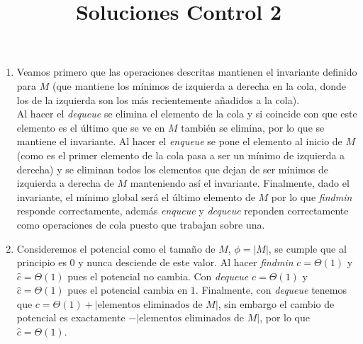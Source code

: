 \documentclass[dcc,uchile]{fcfmcourse}
\title{Soluciones Control 2}
\theoremstyle{plain}
\theoremstyle{definition}
\begin{document}
\maketitle


\vspace{-1ex}


\begin{problems}
\problem
\begin{enumerate}[1.]
    \item Veamos primero que las operaciones descritas mantienen el invariante definido para $M$ (que mantiene los mínimos de izquierda a derecha en la cola, donde los de la izquierda son los más recientemente añadidos a la cola).\\
    Al hacer el \textit{dequeue} se elimina el elemento de la cola y si coincide con que este elemento es el último que se ve en $M$ también se elimina, por lo que se mantiene el invariante. Al hacer el \textit{enqueue} se pone el elemento al inicio de $M$ (como es el primer elemento de la cola pasa a ser un mínimo de izquierda a derecha) y se eliminan todos los elementos que dejan de ser mínimos de izquierda a derecha de $M$ manteniendo así el invariante. Finalmente, dado el invariante, el mínimo global será el último elemento de $M$ por lo que \textit{findmin} responde correctamente, además \textit{enqueue} y \textit{dequeue} reponden correctamente como operaciones de cola puesto que trabajan sobre una.
    \item Consideremos el potencial como el tamaño de $M$, $\phi = |M|$, se cumple que al principio es $0$ y nunca desciende de este valor. Al hacer \textit{findmin} $c = \Theta(1)$ y $\hat{c} = \Theta(1)$ pues el potencial no cambia. Con \textit{dequeue} $c = \Theta(1)$ y $\hat{c} = \Theta(1)$ pues el potencial cambia en $1$. Finalmente, con \textit{dequeue} tenemos que $c = \Theta(1) + |\text{elementos eliminados de $M$}|$, sin embargo el cambio de potencial es exactamente $-|\text{elementos eliminados de $M$}|$, por lo que $\hat{c} = \Theta(1)$.
    

\end{enumerate}
\end{problems}
\end{document}
